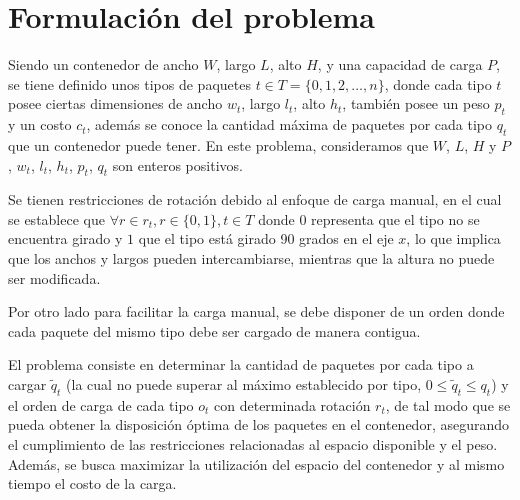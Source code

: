 \section{Formulación del problema}

Siendo un contenedor de ancho $W$, largo $L$, alto $H$, y una capacidad de carga $P$,
se tiene definido unos tipos de paquetes $t \in T = \{0, 1, 2, \ldots, n\}$, donde cada tipo $t$ posee ciertas dimensiones de ancho $w_t$, largo $l_t$, alto $h_t$, también posee un peso $p_t$ y un costo $c_t$, además se conoce la cantidad máxima de paquetes por cada tipo $q_t$ que un contenedor puede tener.
En este problema, consideramos que $W$, $L$, $H$ y $P$ , $w_t$, $l_t$, $h_t$, $p_t$, $q_t$ son enteros positivos.

Se tienen restricciones de rotación debido al enfoque de carga manual, en el cual se establece que $\forall r \in r_t, r \in \{0, 1\}, t \in T$ donde $0$ representa que el tipo no se encuentra girado y $1$ que el tipo está girado 90 grados en el eje $x$, lo que implica que los anchos y largos pueden intercambiarse, mientras que la altura no puede ser modificada.

Por otro lado para facilitar la carga manual, se debe disponer de un orden donde cada paquete del mismo tipo debe ser cargado de manera contigua.

El problema consiste en determinar la cantidad de paquetes por cada tipo a cargar $\tilde{q}_t$ (la cual no puede superar al máximo establecido por tipo, $0 \leq \tilde{q}_t \leq q_t$) y el orden de carga de cada tipo $o_t$ con determinada rotación $r_t$, de tal modo que se pueda obtener la disposición óptima de los paquetes en el contenedor, asegurando el cumplimiento de las restricciones relacionadas al espacio disponible y el peso. Además, se busca maximizar la utilización del espacio del contenedor y al mismo tiempo el costo de la carga.
